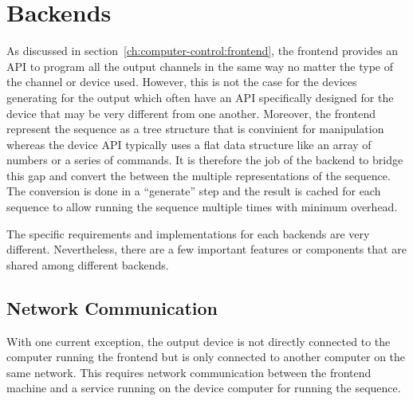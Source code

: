\section{Backends}
\label{ch:computer-control:backend}
As discussed in section~\ref{ch:computer-control:frontend},
the frontend provides an API to program all the output channels in the same way
no matter the type of the channel or device used.
However, this is not the case for the devices generating for the output
which often have an API specifically designed for the device
that may be very different from one another.
Moreover, the frontend represent the sequence as a tree structure
that is convinient for manipulation
whereas the device API typically uses a flat data structure like an array of numbers
or a series of commands.
It is therefore the job of the backend to bridge this gap
and convert the between the multiple representations of the sequence.
The conversion is done in a ``generate'' step and
the result is cached for each sequence to allow running the sequence
multiple times with minimum overhead.

The specific requirements and implementations for each backends are very different.
Nevertheless, there are a few important features or components that are shared among
different backends.

\subsection{Network Communication}
\label{ch:computer-control:backend:net}
With one current exception, the output device is not directly connected to
the computer running the frontend but is only connected to another computer
on the same network.
This requires network communication between the frontend machine and
a service running on the device computer for running the sequence.

